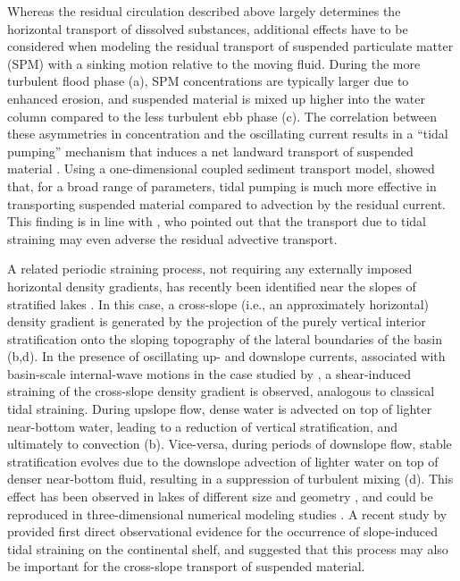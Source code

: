 Whereas the residual circulation described above largely determines
the horizontal transport of dissolved substances, additional effects
have to be considered when modeling the residual transport of
suspended particulate matter (SPM) with a sinking motion relative to
the moving fluid. During the more turbulent flood phase
(a), SPM concentrations are typically larger due to
enhanced erosion, and suspended material is mixed up higher into the
water column compared to the less turbulent ebb phase
(c). The correlation between these asymmetries in
concentration and the oscillating current results in a ``tidal
pumping'' mechanism that induces a net landward transport of suspended
material
\citep{Unclesetal85a,JayMusiak94a,ScullyFriedrichs2007a}. Using a
one-dimensional coupled sediment transport model,
\cite{Burchardetal2013a} showed that, for a broad range of parameters,
tidal pumping is much more effective in transporting suspended
material compared to advection by the residual current. This finding
is in line with \cite{ScullyFriedrichs2003a}, who pointed out that the
transport due to tidal straining may even adverse the residual
advective transport.

A related periodic straining process, not requiring any externally
imposed horizontal density gradients, has recently been identified
near the slopes of stratified lakes \citep{Lorkeetal2005a}. In this
case, a cross-slope (i.e., an approximately horizontal) density
gradient is generated by the projection of the purely vertical
interior stratification onto the sloping topography of the lateral
boundaries of the basin (b,d). In the presence of
oscillating up- and downslope currents, associated with basin-scale
internal-wave motions in the case studied by \cite{Lorkeetal2005a}, a
shear-induced straining of the cross-slope density gradient is
observed, analogous to classical tidal straining. During upslope flow,
dense water is advected on top of lighter near-bottom water, leading
to a reduction of vertical stratification, and ultimately to
convection (b). Vice-versa, during periods of downslope
flow, stable stratification evolves due to the downslope advection of
lighter water on top of denser near-bottom fluid, resulting in a
suppression of turbulent mixing (d). This effect has
been observed in lakes of different size and geometry
\citep{Lorkeetal2005a,Lorkeetal2008a,CossuWells2013a}, and could be
reproduced in three-dimensional numerical modeling studies
\citep{BechererUmlauf2011a,Lorraietal2011a}. A recent study by
\cite{Endohetal2016a} provided first direct observational evidence for
the occurrence of slope-induced tidal straining on the continental
shelf, and suggested that this process may also be important for the
cross-slope transport of suspended material.

